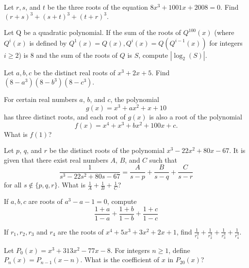 \documentclass[mast]{lucky}
\begin{document}
\begin{prob}[BMT 2015]{2}
Let $r, s$, and $t$ be the three roots of the equation $8x^3 + 1001x + 2008 = 0$. Find
$(r + s)^3 + (s + t)^3 + (t + r)^3.$
\end{prob}

\begin{prob}[PuMAC 2019]{3}
Let Q be a quadratic polynomial. If the sum of the roots of $Q^{100}(x)$ (where $Q^{i}(x)$ is defined
by $Q^{1}(x) = Q(x), Q^{i}(x) = Q(Q^{i-1}(x))$ for integers $i \ge 2$) is $8$ and the sum of the roots of $Q$
is $S$, compute $|\log_{2}(S)|$.
\end{prob}

\begin{prob}{3}
Let $a,b,c$ be the distinct real roots of $x^3+2x+5$. Find $(8-a^3)(8-b^3)(8-c^3)$.
\end{prob}

\begin{prob}[AMC 10A 2017/24]{3}
For certain real numbers $a$, $b$, and $c$, the polynomial\[g(x) = x^3 + ax^2 + x + 10\]has three distinct roots, and each root of $g(x)$ is also a root of the polynomial\[f(x) = x^4 + x^3 + bx^2 + 100x + c.\]What is $f(1)$?
\end{prob}

\begin{req}[AMC 10A 2019/24]{3}
Let $p$, $q$, and $r$ be the distinct roots of the polynomial $x^3 - 22x^2 + 80x - 67$. It is given that there exist real numbers $A$, $B$, and $C$ such that $$\dfrac{1}{s^3 - 22s^2 + 80s - 67} = \dfrac{A}{s-p} + \dfrac{B}{s-q} + \frac{C}{s-r}$$for all $s\not\in\{p,q,r\}$. What is $\tfrac1A+\tfrac1B+\tfrac1C$?
\end{req}

\begin{prob}[Canada]{3}
If $a,b,c$ are roots of $a^3-a-1=0$, compute
$$\frac{1+a}{1-a}+\frac{1+b}{1-b}+\frac{1+c}{1-c}$$
\end{prob}

\begin{prob}{3}
If $r_{1},r_{2},r_{3}$ and $r_{4}$ are the roots of $x^4+5x^3+3x^2+2x+1$, find $\frac{1}{r_{1}^3}+\frac{1}{r_{2}^3}+\frac{1}{r_{3}^3}+\frac{1}{r_{4}^3}$.
\end{prob}

\begin{prob}[AIME 1993/5]{3}
Let $P_0(x) = x^3 + 313x^2 - 77x - 8$. For integers $n \ge 1$, define $P_n(x) = P_{n - 1}(x - n)$. What is the coefficient of $x$ in $P_{20}(x)$?
\end{prob}
\end{document}
